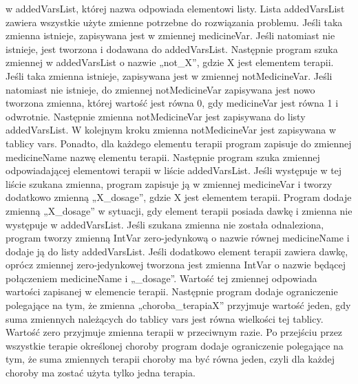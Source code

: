 w addedVarsList, której nazwa odpowiada elementowi listy. Lista addedVarsList zawiera wszystkie użyte zmienne potrzebne do rozwiązania problemu. Jeśli taka zmienna istnieje, zapisywana jest w zmiennej medicineVar. Jeśli natomiast nie istnieje, jest tworzona i dodawana do addedVarsList. Następnie program szuka zmiennej w addedVarsList o nazwie „not\_X”, gdzie X jest elementem terapii. Jeśli taka zmienna istnieje, zapisywana jest w zmiennej notMedicineVar. Jeśli natomiast nie istnieje, do zmiennej notMedicineVar zapisywana jest nowo tworzona zmienna, której wartość jest równa 0, gdy medicineVar jest równa 1 i odwrotnie. Następnie zmienna notMedicineVar jest zapisywana do listy addedVarsList. W kolejnym kroku zmienna notMedicineVar jest zapisywana w tablicy vars. Ponadto, dla każdego elementu terapii program zapisuje do zmiennej medicineName nazwę elementu terapii. Następnie program szuka zmiennej odpowiadającej elementowi terapii w liście addedVarsList. Jeśli występuje w tej liście szukana zmienna, program zapisuje ją w zmiennej medicineVar i tworzy dodatkowo zmienną „X\_dosage”, gdzie X jest elementem terapii. Program dodaje zmienną „X\_dosage” w sytuacji, gdy element terapii posiada dawkę i zmienna nie występuje w addedVarsList. Jeśli szukana zmienna nie została odnaleziona, program tworzy zmienną IntVar zero-jedynkową o nazwie równej medicineName i dodaje ją do listy addedVarsList. Jeśli dodatkowo element terapii zawiera dawkę, oprócz zmiennej zero-jedynkowej tworzona jest zmienna IntVar o nazwie będącej połączeniem medicineName i „\_dosage”. Wartość tej zmiennej odpowiada wartości zapisanej w elemencie terapii. Następnie program dodaje ograniczenie polegające na tym, że zmienna „choroba\_terapiaX” przyjmuje wartość jeden, gdy suma zmiennych należących do tablicy vars jest równa wielkości tej tablicy. Wartość zero przyjmuje zmienna terapii w przeciwnym razie. Po przejściu przez wszystkie terapie określonej choroby program dodaje ograniczenie polegające na tym, że suma zmiennych terapii choroby ma być równa jeden, czyli dla każdej choroby ma zostać użyta tylko jedna terapia. 


